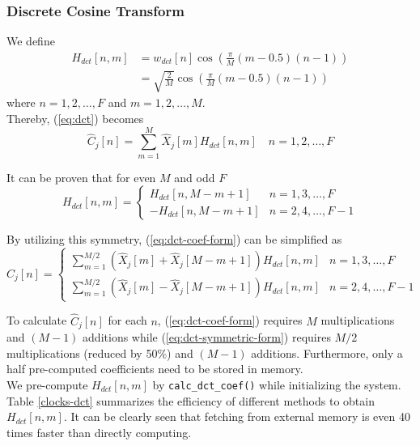 
\subsubsection{Discrete Cosine Transform}

We define
\begin{align}
\label{eq:dct-coef}
H_{dct}[n, m] &= w_{dct}[n] \cos \left( \frac{\pi}{M} (m - 0.5) (n-1) \right)\\
&= \sqrt{\frac{2}{M}} \cos \left( \frac{\pi}{M} (m - 0.5) (n-1) \right)
\end{align}
where $n = 1, 2, \dots, F$ and $m = 1, 2, \dots, M$.\\

Thereby, (\ref{eq:dct}) becomes
\begin{equation}
\label{eq:dct-coef-form}
\hat{C}_j[n] = \sum^{M}_{m=1} \hat{X}_j[m] H_{dct}[n, m] \quad n = 1, 2, \dots, F
\end{equation}

It can be proven that for even $M$ and odd $F$
\begin{equation}
H_{dct}[n, m] =
\begin{cases}
H_{dct}[n, M-m+1] & n = 1, 3, \dots, F\\
-H_{dct}[n, M-m+1] & n = 2, 4, \dots, F-1
\end{cases}
\end{equation}

By utilizing this symmetry, (\ref{eq:dct-coef-form}) can be simplified as
\begin{equation}
\label{eq:dct-symmetric-form}
\hat{C}_j[n] = 
\begin{cases}
\displaystyle\sum^{M/2}_{m=1} (\hat{X}_j[m] + \hat{X}_j[M-m+1]) H_{dct}[n, m] & n = 1, 3, \dots, F\\
\displaystyle\sum^{M/2}_{m=1} (\hat{X}_j[m] - \hat{X}_j[M-m+1]) H_{dct}[n, m] & n = 2, 4, \dots, F-1
\end{cases}
\end{equation}

To calculate $\hat{C}_j[n]$ for each $n$, (\ref{eq:dct-coef-form}) requires $M$ multiplications and $(M - 1)$ additions while (\ref{eq:dct-symmetric-form}) requires $M/2$ multiplications (reduced by 50\%) and $(M - 1)$ additions. Furthermore, only a half pre-computed coefficients need to be stored in memory.\\

We pre-compute $H_{dct}[n, m]$ by \texttt{calc\_dct\_coef()} while initializing the system. Table \ref{clocks-dct} summarizes the efficiency of different methods to obtain $H_{dct}[n, m]$. It can be clearly seen that fetching from external memory is even 40 times faster than directly computing.

